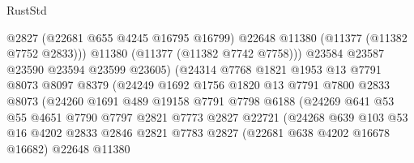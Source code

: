 \begin{lexlean}{RustStd}
\begin{coremodule}
                                  @2827
                                  (@22681 @655 @4245 @16795 @16799)
                                  @22648
                                  @11380
                                  (@11377 (@11382 @7752 @2833)))
                                @11380
                                (@11377 (@11382 @7742 @7758)))
                              @23584
                              @23587
                              @23590
                              @23594
                              @23599
                              @23605)
                            (@24314
                              @7768
                              @1821
                              @1953
                              @13
                              @7791
                              @8073
                              @8097
                              @8379
                              (@24249
                                @1692
                                @1756
                                @1820
                                @13
                                @7791
                                @7800
                                @2833
                                @8073
                                (@24260
                                  @1691
                                  @489
                                  @19158
                                  @7791
                                  @7798
                                  @6188
                                  (@24269
                                    @641
                                    @53
                                    @55
                                    @4651
                                    @7790
                                    @7797
                                    @2821
                                    @7773
                                    @2827
                                    @22721
                                    (@24268
                                      @639
                                      @103
                                      @53
                                      @16
                                      @4202
                                      @2833
                                      @2846
                                      @2821
                                      @7783
                                      @2827
                                      (@22681 @638 @4202 @16678 @16682)
                                      @22648
                                      @11380

\end{coremodule}
\end{lexlean}

